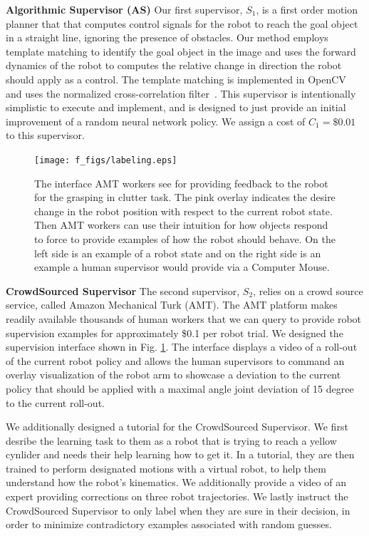 \documentclass[10pt, conference]{ieeeconf}      %
\begin{document}
\noindent \textbf{Algorithmic Supervisor (AS)} Our first supervisor, $S_1$, is a first order motion planner that that computes
control signals for the robot to reach the goal object in a straight line, ignoring the presence of obstacles. Our
method employs template matching to identify the goal object in the image and uses the forward dynamics of the robot to
computes the relative change in direction the robot should apply as a control. The template matching is implemented in
OpenCV and uses the normalized cross-correlation filter~\cite{opencv_library}. This supervisor is intentionally
simplistic to execute and implement, and is designed to just provide an initial improvement of a random neural network policy.
We assign a cost of $C_1 = \$0.01$ to this supervisor.
\begin{figure}[t]
\centering

\texttt{[image: f\_figs/labeling.eps]}

\caption{\footnotesize  The interface AMT workers see for providing feedback to the robot for the grasping in clutter task. The pink overlay indicates the desire change in the robot position with respect to the current robot state. Then AMT workers can use their intuition for how objects respond to force to provide examples of how the robot should behave. On the left side is an example of a robot state and on the right side is an example a human supervisor would provide via a Computer Mouse.}
\vspace*{-10pt}
\label{fig:overlays}
\end{figure}

\noindent \textbf{CrowdSourced Supervisor} The second supervisor, $S_2$, relies on a crowd source service, called Amazon
Mechanical Turk (AMT). The AMT platform makes readily available thousands of human workers that we can query to provide robot
supervision examples for approximately \$0.1 per robot trial. 
We designed the supervision interface shown in Fig. \ref{fig:overlays}. The interface displays a video of a roll-out of
the current robot policy and allows the human supervisors to command an overlay visualization of the robot arm to
showcase a deviation to the current policy that should be applied with a maximal angle joint deviation of 15 degree to
the current roll-out.

We additionally designed a tutorial for the CrowdSourced Supervisor. We first desribe the learning task to them as a
robot that is trying to reach a yellow cynlider and needs their help learning how to get it. In a tutorial, they are then trained
to perform designated motions with a virtual robot, to help them understand how the robot's kinematics. We additionally
provide a video of an expert providing corrections on three robot trajectories. We lastly instruct the CrowdSourced
Supervisor to only label when they are sure in their decision, in order to minimize contradictory examples associated
with random guesses.  
\end{document}
